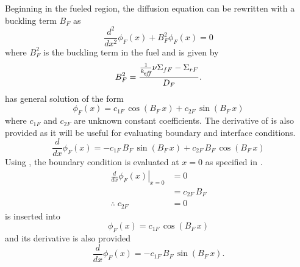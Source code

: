   Beginning in the fueled region, the diffusion equation  can be
  rewritten with a buckling term $B_F$ as
  \begin{equation}
    \label{eq:2regF_buckle}
    \frac{d^2}{dx^2} \phi_F(x) + B_F^2 \phi_F(x) = 0 
  \end{equation}
  where $B_F^2$ is the buckling term in the fuel and is given by
  \begin{equation}
    \label{eq:2regF_b2}
    B_F^2 = \frac{\frac{1}{k_{\!\mbox{\scriptsize \em eff}}} \nu \Sigma_{fF} - \Sigma_{rF}}{D_F}.
  \end{equation}
   has general solution of the form
  \begin{equation}
    \label{eq:2regF_general}
    \phi_F(x) = c_{1F} \, \cos(B_F\,x) + c_{2F} \, \sin(B_F\,x)
  \end{equation}
  where $c_{1F}$ and $c_{2F}$ are unknown constant coefficients.
  The derivative of  is also provided as it will be
  useful for evaluating boundary and interface conditions.
  \begin{equation}
    \label{eq:2regF_general_derivative}
    \frac{d}{dx}\phi_F(x) = -c_{1F} \, B_F \, \sin(B_F\,x) + 
      c_{2F} \, B_F \, \cos(B_F\,x)
  \end{equation}
  Using , the boundary condition is evaluated
  at $x=0$ as specified in .
  \begin{align}
    \left. \frac{d}{dx} \phi_F(x) \right|_{x=0} &= 0 \\
    &= c_{2F} \, B_F \\
    \label{eq:2reg_c2f}
    \therefore \; c_{2F} &= 0
  \end{align}
   is inserted into 
  \begin{equation}
    \label{eq:2regF_cos}
    \phi_F(x) = c_{1F} \, \cos(B_F\, x)
  \end{equation}
  and its derivative is also provided
  \begin{equation}
    \label{eq:2regF_cos_derivative}
    \frac{d}{dx} \phi_F(x) = -c_{1F} \, B_F \, \sin(B_F \, x).
  \end{equation}

